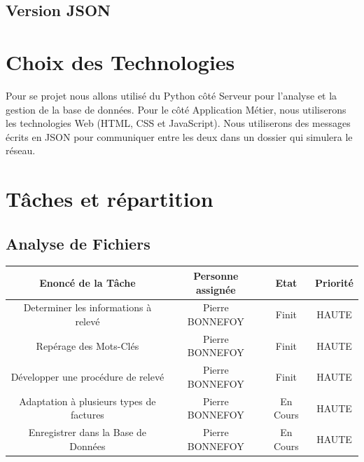 \documentclass[a4paper, 11pt]{article}
\begin{document}
        \subsubsection{}

    \subsection{Version JSON}

\section{Choix des Technologies}
Pour se projet nous allons utilisé du Python côté Serveur pour l'analyse et la gestion de la base de données. Pour le côté Application Métier, nous utiliserons les technologies Web (HTML, CSS et JavaScript). Nous utiliserons des messages écrits en JSON pour communiquer entre les deux dans un dossier qui simulera le réseau.

\section{Tâches et répartition}
    \subsection{Analyse de Fichiers}
    \begin{center}
    \begin{tabular}{|c|c|c|c|}
        \hline
        Enoncé de la Tâche & Personne assignée & Etat & Priorité\\
        \hline
        \hline
        Determiner les informations à relevé  & Pierre BONNEFOY & Finit & HAUTE \\
        \hline
        Repérage des Mots-Clés & Pierre BONNEFOY & Finit & HAUTE  \\
        \hline
        Développer une procédure de relevé & Pierre BONNEFOY & Finit & HAUTE  \\
        \hline
        Adaptation à plusieurs types de factures & Pierre BONNEFOY & En Cours & HAUTE  \\
        \hline
        Enregistrer dans la Base de Données & Pierre BONNEFOY & En Cours & HAUTE  \\
        \hline
    \end{tabular}
    \end{center}
\end{document}

